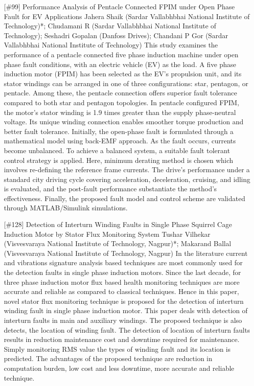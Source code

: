 {} \begin{abstract_online} {[\#99] Performance Analysis of Pentacle Connected FPIM under Open Phase Fault for EV Applications} {} {Jahera Shaik (Sardar Vallabhbhai National Institute of Technology)*; Chudamani R (Sardar Vallabhbhai National Institute of Technology); Seshadri  Gopalan (Danfoss Drives); Chandani  P Gor (Sardar Vallabhbhai National Institute of Technology)} {} This study examines the performance of a pentacle connected five phase induction machine under open phase fault conditions, with an electric vehicle (EV) as the load. A five phase induction motor (FPIM) has been selected as the EV's propulsion unit, and its stator windings can be arranged in one of three configurations: star, pentagon, or pentacle. Among these, the pentacle connection offers superior fault tolerance compared to both star and pentagon topologies. In pentacle configured FPIM, the motor's stator winding is 1.9 times greater than the supply phase-neutral voltage. Its unique winding connection enables smoother torque production and better fault tolerance. Initially, the open-phase fault is formulated through a mathematical model using back-EMF approach. As the fault occurs, currents become unbalanced. To achieve a balanced system, a suitable fault tolerant control strategy is applied. Here, minimum derating method is chosen which involves re-defining the reference frame currents.  The drive's performance under a standard city driving cycle covering acceleration, deceleration, cruising, and idling is evaluated, and the post-fault performance substantiate the method's effectiveness. Finally, the proposed fault model and control scheme are validated through MATLAB/Simulink simulations. \end{abstract_online} 
{} \begin{abstract_online} {[\#128] Detection of Interturn Winding Faults in Single Phase Squirrel Cage Induction Motor by Stator Flux Monitoring System} {} {Tushar Vilhekar (Visvesvaraya National Institute of Technology, Nagpur)*; Makarand Ballal (Visvesvaraya National Institute of Technology, Nagpur)} {} In the literature current and vibrations signature analysis based techniques are most commonly used for the detection faults in single phase induction motors. Since the last decade, for three phase induction motor flux based health monitoring techniques are more accurate and reliable as compared to classical techniques. Hence in this paper, novel stator flux monitoring technique is proposed for the detection of interturn winding fault in single phase induction motor. This paper deals with detection of interturn faults in main and auxiliary windings. The proposed technique is also detects, the location of winding fault. The detection of location of interturn faults results in reduction maintenance cost and downtime required for maintenance. Simply monitoring RMS value the types of winding fault and its location is predicted. The advantages of the proposed technique are reduction in computation burden, low cost and less downtime, more accurate and reliable technique. \end{abstract_online} 
